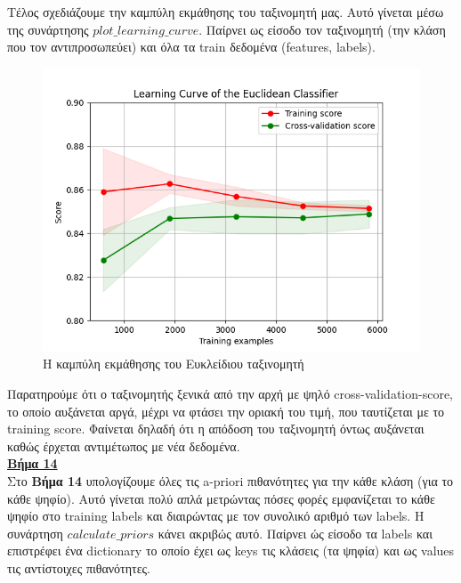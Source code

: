 \documentclass[11pt]{article} %
\begin{document}
Τέλος σχεδιάζουμε την καμπύλη εκμάθησης του ταξινομητή μας. Αυτό γίνεται μέσω της συνάρτησης $plot\_learning\_curve$. Παίρνει ως είσοδο τον ταξινομητή (την κλάση που τον αντιπροσωπεύει) και όλα τα train δεδομένα (features, labels). 

\begin{figure}[H]
    \centering
    \includegraphics[width=1\textwidth]{plots/lc_eu.png}
    \caption{Η καμπύλη εκμάθησης του Ευκλείδιου ταξινομητή}
    \label{fig:learningcurve}
\end{figure}

Παρατηρούμε ότι ο ταξινομητής ξενικά από την αρχή με ψηλό cross-validation-score, το οποίο αυξάνεται αργά, μέχρι να φτάσει την οριακή του τιμή, που ταυτίζεται με το training score. Φαίνεται δηλαδή ότι η απόδοση του ταξινομητή όντως αυξάνεται καθώς έρχεται αντιμέτωπος με νέα δεδομένα.\\

\underline{\textbf{Βήμα 14}}\\

Στο \textbf{Βήμα 14} υπολογίζουμε όλες τις a-priori πιθανότητες για την κάθε κλάση (για το κάθε ψηφίο). Αυτό γίνεται πολύ απλά μετρώντας πόσες φορές εμφανίζεται το κάθε ψηφίο στο training labels και διαιρώντας με τον συνολικό αριθμό των labels. Η συνάρτηση $calculate\_priors$ κάνει ακριβώς αυτό. Παίρνει ώς είσοδο τα labels και επιστρέφει ένα dictionary το οποίο έχει ως keys τις κλάσεις  (τα ψηφία) και ως values τις αντίστοιχες πιθανότητες.\\
\end{document}
